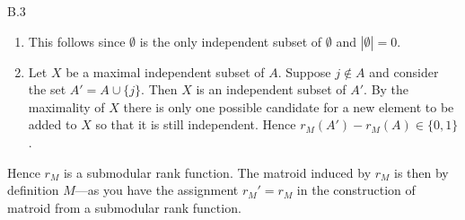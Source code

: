 \documentclass[a4paper]{article}
\begin{document}
\begin{exercise}{B.3}
\begin{enumerate}[label=(\roman*)]
      \item This follows since $ \emptyset $ is the only independent subset of $ \emptyset $ and $ |\emptyset| = 0 $.

      \item Let $ X $ be a maximal independent subset of $ A $. Suppose $ j \not\in A $ and consider the set $ A' = A \cup \{j\} $. Then $ X $ is an independent subset of $ A' $. By the maximality of $ X $ there is only one possible candidate for a new element to be added to $ X $ so that it is still independent. Hence $ r_M(A') - r_M(A) \in \{0, 1\} $.
    \end{enumerate}
    Hence $ r_M $ is a submodular rank function. The matroid induced by $ r_M $ is then by definition $ M $---as you have the assignment $ r_M' = r_M $ in the construction of matroid from a submodular rank function.
  \end{exercise}
\end{document}
